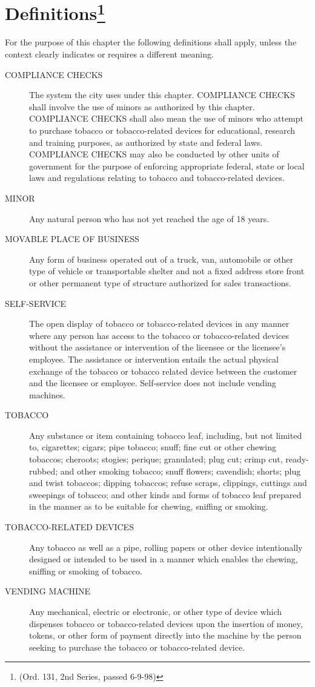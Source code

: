 \section{Definitions\footnote{(Ord. 131, 2nd Series, passed 6-9-98)}}
For the purpose of this chapter the following definitions shall apply, unless the context clearly indicates or requires a different meaning.
\begin{description}
    \item[COMPLIANCE CHECKS] The system the city uses under this chapter. COMPLIANCE CHECKS shall involve the use of minors as authorized by this chapter. COMPLIANCE CHECKS shall also mean the use of minors who attempt to purchase tobacco or tobacco-related devices for educational, research and training purposes, as authorized by state and federal laws. COMPLIANCE CHECKS may also be conducted by other units of government for the purpose of enforcing appropriate federal, state or local laws and regulations relating to tobacco and tobacco-related devices.
    \item[MINOR] Any natural person who has not yet reached the age of 18 years.
    \item[MOVABLE PLACE OF BUSINESS] Any form of business operated out of a truck, van, automobile or other type of vehicle or transportable shelter and not a fixed address store front or other permanent type of structure authorized for sales transactions.
    \item[SELF-SERVICE] The open display of tobacco or tobacco-related devices in any manner where any person has access to the tobacco or tobacco-related devices without the assistance or intervention of the licensee or the licensee’s employee.  The assistance or intervention entails the actual physical exchange of the tobacco or tobacco related device between the customer and the licensee or employee.  Self-service does not include vending machines.
    \item[TOBACCO] Any substance or item containing tobacco leaf, including, but not limited to, cigarettes; cigars; pipe tobacco; snuff; fine cut or other chewing tobaccos; cheroots; stogies; perique; granulated; plug cut; crimp cut, ready-rubbed; and other smoking tobacco; snuff flowers; cavendish; shorts; plug and twist tobaccos; dipping tobaccos; refuse scraps, clippings, cuttings and sweepings of tobacco; and other kinds and forms of tobacco leaf prepared in the manner as to be suitable for chewing, sniffing or smoking.
    \item[TOBACCO-RELATED DEVICES] Any tobacco as well as a pipe, rolling papers or other device intentionally designed or intended to be used in a manner which enables the chewing, sniffing or smoking of tobacco.
    \item[VENDING MACHINE] Any mechanical, electric or electronic, or other type of device which dispenses tobacco or tobacco-related devices upon the insertion of money, tokens, or other form of payment directly into the machine by the person seeking to purchase the tobacco or tobacco-related device.
\end{description}
